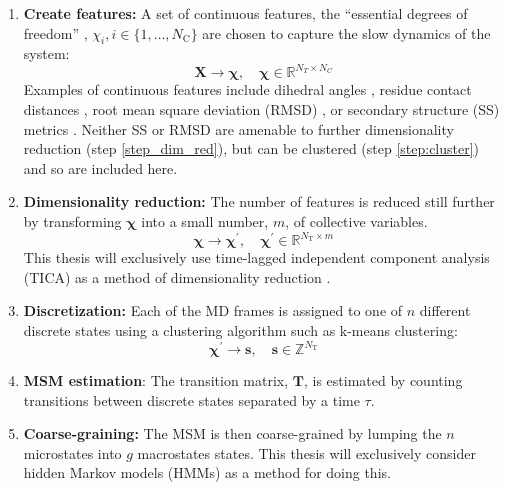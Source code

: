 \begin{enumerate}
    \item \textbf{Create features:} A set of continuous features, the ``essential degrees of freedom'' \cite{schutteDirectApproachConformational1999}, $\chi_{i}, i \in \{1,\dots, N_{\mathrm{C}} \}$ are chosen to capture the slow dynamics of the system:
    \begin{equation*}
        \mathbf{X}  \rightarrow \bm{\chi},\quad \bm{\chi} \in \mathbb{R}^{N_{T} \times N_{C}}
    \end{equation*}
    Examples of continuous features include dihedral angles \cite{noeHierarchicalAnalysisConformational2007,choderaLongTimeProtein2006a,kubeCoarseGrainingMethod2007b,bucheteCoarseMasterEquations2008a}, residue contact distances \cite{stanleyKineticModulationDisordered2014,zhouDistributionReciprocalInteratomic2012,shuklaConformationalHeterogeneityCalmodulin2016}, root mean square deviation (RMSD) \cite{noe2009constructing,bowmanAtomisticFoldingSimulations2011a}, or secondary structure (SS) metrics \cite{muffKineticAnalysisMolecular2008}. Neither SS or RMSD are amenable to further dimensionality reduction (step \ref{step_dim_red}), but can be clustered (step \ref{step:cluster}) and so are included here. 
    \item \textbf{Dimensionality reduction:} The number of features is reduced still further by transforming $\bm{\chi}$ into a small number, $m$, of collective variables. 
    \begin{equation*}
        \bm{\chi}  \rightarrow \bm{\chi}^{\prime},\quad \bm{\chi}^{\prime} \in \mathbb{R}^{N_{\mathrm{T}} \times m}
    \end{equation*}
    This thesis will exclusively use time-lagged independent component analysis (TICA)  as a method of dimensionality reduction \cite{perez-hernandezIdentificationSlowMolecular2013a} \cite{schwantesImprovementsMarkovState2013}.\label{step_dim_red}
    \item \textbf{Discretization:} Each of the MD frames is assigned to one of $n$ different discrete states using a clustering algorithm such as k-means \cite{lloydLeastSquaresQuantization1982} clustering: 
    \begin{equation*}
        \bm{\chi}^{\prime} \rightarrow \mathbf{s},\quad \mathbf{s} \in \mathbb{Z}^{N_{\mathrm{T}}}
    \end{equation*}\label{step:cluster}
    \item \textbf{MSM estimation}: The transition matrix, $\mathbf{T}$, is estimated by counting transitions between discrete states separated by a time $\tau$. 
    \item \textbf{Coarse-graining:} The MSM is then coarse-grained by lumping the $n$ microstates into $g$ macrostates states. This thesis will exclusively consider hidden Markov models (HMMs) as a method for doing this. 
\end{enumerate}

